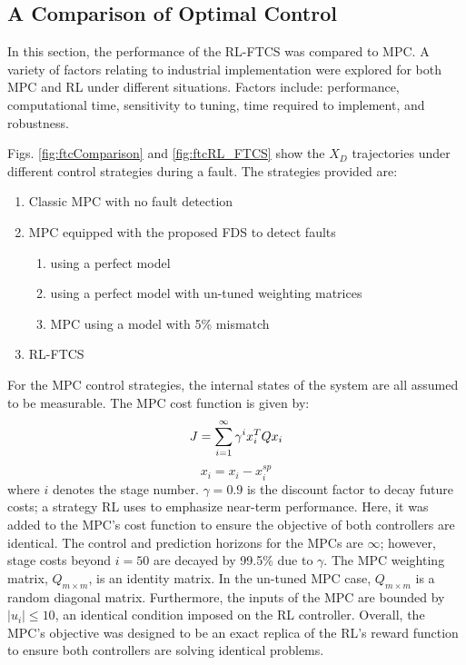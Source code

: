 \subsection{A Comparison of Optimal Control}

In this section, the performance of the RL-FTCS was compared to MPC. A variety of factors relating to industrial implementation were explored for both MPC and RL under different situations. Factors include: performance, computational time, sensitivity to tuning, time required to implement, and robustness.

Figs. \ref{fig:ftcComparison} and \ref{fig:ftcRL_FTCS} show the $X_D$ trajectories under different control strategies during a fault. The strategies provided are:
\begin{enumerate}
    \item Classic MPC with no fault detection
    \item MPC equipped with the proposed FDS to detect faults
    \begin{enumerate}
        \item using a perfect model
        \item using a perfect model with un-tuned weighting matrices
        \item MPC using a model with 5\% mismatch 
    \end{enumerate}
    \item RL-FTCS
\end{enumerate}
For the MPC control strategies, the internal states of the system are all assumed to be measurable. The MPC cost function is given by:
\begin{equation}
        J = \sum\limits^{\infty}_{i=1} \gamma^i x_{i}^T Q x_{i} \\
\end{equation}
$$   x_{i} = x_i - x_i^{sp}$$
where $i$ denotes the stage number.  $\gamma = 0.9$ is the discount factor to decay future costs; a strategy RL uses to emphasize near-term performance. Here, it was added to the MPC's cost function to ensure the objective of both controllers are identical.  The control and prediction horizons for the MPCs are $\infty$; however, stage costs beyond $i = 50$ are decayed by 99.5\% due to $\gamma$. The MPC weighting matrix, $Q_{m \times m}$, is an identity matrix.  In the un-tuned MPC case, $Q_{m \times m}$ is a random diagonal matrix. Furthermore, the inputs of the MPC are bounded by $|u_i| \leq 10$, an identical condition imposed on the RL controller. Overall, the MPC's objective was designed to be an exact replica of the RL's reward function to ensure both controllers are solving identical problems.

